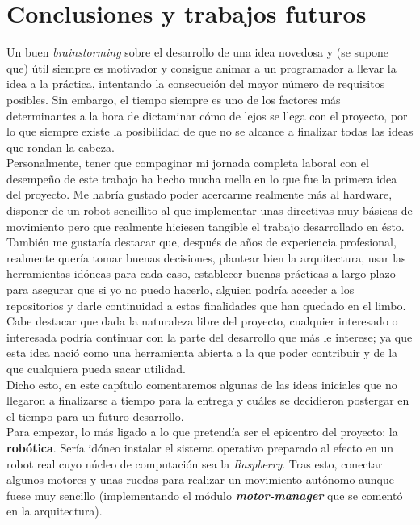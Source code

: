 \chapter{Conclusiones y trabajos futuros}

Un buen \textit{brainstorming} sobre el desarrollo de una idea novedosa y (se supone que) útil siempre es motivador y consigue animar a un programador a llevar la idea a la práctica, intentando la consecución del mayor número de requisitos posibles. Sin embargo, el tiempo siempre es uno de los factores más determinantes a la hora de dictaminar cómo de lejos se llega con el proyecto, por lo que siempre existe la posibilidad de que no se alcance a finalizar todas las ideas que rondan la cabeza.\\

Personalmente, tener que compaginar mi jornada completa laboral con el desempeño de este trabajo ha hecho mucha mella en lo que fue la primera idea del proyecto. Me habría gustado poder acercarme realmente más al hardware, disponer de un robot sencillito al que implementar unas directivas muy básicas de movimiento pero que realmente hiciesen tangible el trabajo desarrollado en ésto.\\

También me gustaría destacar que, después de años de experiencia profesional, realmente quería tomar buenas decisiones, plantear bien la arquitectura, usar las herramientas idóneas para cada caso, establecer buenas prácticas a largo plazo para asegurar que si yo no puedo hacerlo, alguien podría acceder a los repositorios y darle continuidad a estas finalidades que han quedado en el limbo.\\

Cabe destacar que dada la naturaleza libre del proyecto, cualquier interesado o interesada podría continuar con la parte del desarrollo que más le interese; ya que esta idea nació como una herramienta abierta a la que poder contribuir y de la que cualquiera pueda sacar utilidad.\\

Dicho esto, en este capítulo comentaremos algunas de las ideas iniciales que no llegaron a finalizarse a tiempo para la entrega y cuáles se decidieron postergar en el tiempo para un futuro desarrollo.\\

Para empezar, lo más ligado a lo que pretendía ser el epicentro del proyecto: la \textbf{robótica}. Sería idóneo instalar el sistema operativo preparado al efecto en un robot real cuyo núcleo de computación sea la \textit{Raspberry}. Tras esto, conectar algunos motores y unas ruedas para realizar un movimiento autónomo aunque fuese muy sencillo (implementando el módulo \textbf{\textit{motor-manager}} que se comentó en la arquitectura).\\

